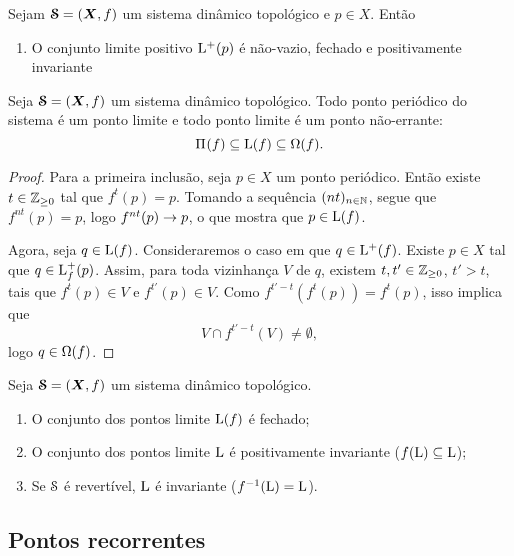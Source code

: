\begin{proposition}
Sejam $\bm{\mathcal{S}}=(\bm X,f)$ um sistema dinâmico topológico e $p \in X$. Então
	\begin{enumerate}
	\item O conjunto limite positivo $\mathrm{L}^+(p)$ é não-vazio, fechado e positivamente invariante
	\end{enumerate}
\end{proposition}

\begin{proposition}
Seja $\bm{\mathcal{S}}=(\bm X,f)$ um sistema dinâmico topológico. Todo ponto periódico do sistema é um ponto limite e todo ponto limite é um ponto não-errante:
	\begin{equation*}
	\Pi^{}(f) \subseteq \mathrm{L}(f) \subseteq \Omega(f).
	\end{equation*}
\end{proposition}
\begin{proof}
Para a primeira inclusão, seja $p \in X$ um ponto periódico. Então existe $t \in \mathbb{Z}_{\geq 0}$ tal que $f^t(p)=p$. Tomando a sequência $(nt)_{n \in \mathbb{N}}$, segue que $f^{nt}(p) = p$, logo $f^{nt}(p) \rightarrow p$, o que mostra que $p \in \mathrm{L}(f)$.

Agora, seja $q \in \mathrm{L}(f)$. Consideraremos o caso em que $q \in \mathrm{L}^+(f)$. Existe $p \in X$ tal que $q \in \mathrm{L}^+_f(p)$. Assim,  para toda vizinhança $V$ de $q$, existem $t,t' \in \mathbb{Z}_{\geq 0}$, $t'>t$, tais que $f^t(p) \in V$ e $f^{t'}(p) \in V$. Como $f^{t'-t}(f^t(p)) = f^t(p)$, isso implica que
	\begin{equation*}
	V \cap f^{t'-t}(V) \neq \emptyset,
	\end{equation*}
logo $q \in \Omega(f)$.
\end{proof}


\begin{proposition}
Seja $\bm{\mathcal{S}}=(\bm X,f)$ um sistema dinâmico topológico.
	\begin{enumerate}
	\item O conjunto dos pontos limite $\mathrm{L}(f)$ é fechado;
	\item O conjunto dos pontos limite $\mathrm{L}$ é positivamente invariante ($f(\mathrm{L}) \subseteq \mathrm{L}$);
	\item Se $\mathcal{S}$ é revertível, $\mathrm{L}$ é invariante ($f^{-1}(\mathrm{L}) = \mathrm{L}$).
	\end{enumerate}
\end{proposition}

\subsection{Pontos recorrentes}

